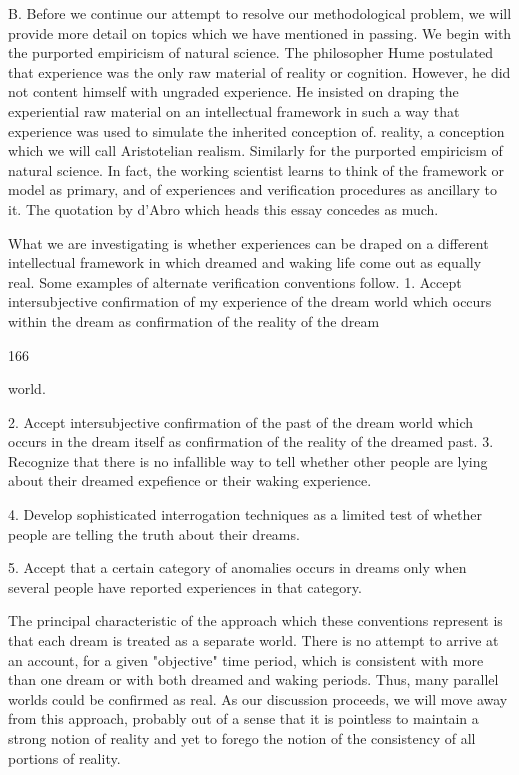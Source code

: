\documentclass[10pt,twoside]{memoir}
\begin{document}
\begin{enumerate}
{{B. Before we continue our attempt to resolve our methodological 
problem, we will provide more detail on topics which we have mentioned in 
passing. We begin with the purported empiricism of natural science. The 
philosopher Hume postulated that experience was the only raw material of 
reality or cognition. However, he did not content himself with ungraded 
experience. He insisted on draping the experiential raw material on an 
intellectual framework in such a way that experience was used to simulate 
the inherited conception of. reality, a conception which we will call 
Aristotelian realism. Similarly for the purported empiricism of natural 
science. In fact, the working scientist learns to think of the framework or 
model as primary, and of experiences and verification procedures as ancillary 
to it. The quotation by d'Abro which heads this essay concedes as much. 

What we are investigating is whether experiences can be draped on a 
different intellectual framework in which dreamed and waking life come out 
as equally real. Some examples of alternate verification conventions follow. 
1. Accept intersubjective confirmation of my experience of the dream world 
which occurs within the dream as confirmation of the reality of the dream 


166 


world. 

2. Accept intersubjective confirmation of the past of the dream world which 
occurs in the dream itself as confirmation of the reality of the dreamed past. 
3. Recognize that there is no infallible way to tell whether other people are 
lying about their dreamed expefience or their waking experience. 

4. Develop sophisticated interrogation techniques as a limited test of 
whether people are telling the truth about their dreams. 


5. Accept that a certain category of anomalies occurs in dreams only when 
several people have reported experiences in that category. 

The principal characteristic of the approach which these conventions 
represent is that each dream is treated as a separate world. There is no 
attempt to arrive at an account, for a given "objective" time period, which is 
consistent with more than one dream or with both dreamed and waking 
periods. Thus, many parallel worlds could be confirmed as real. As our 
discussion proceeds, we will move away from this approach, probably out of 
a sense that it is pointless to maintain a strong notion of reality and yet to 
forego the notion of the consistency of all portions of reality. 

}}
\end{enumerate}
\end{document}
